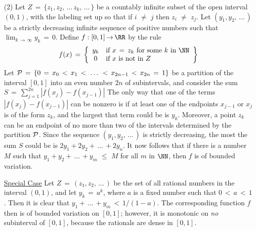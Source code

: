 \V
\V

        (2) Let $Z \,=\, \{z_{1},z_{2},\,{\ldots}\,z_{k},\,{\ldots}\,\}$ be a countably infinite subset of the open interval $(0,1)$,
    with the labeling set up so that if $i \,\,{\neq}\,\, j$ then $z_{i} \,\,{\neq}\,\, z_{j}$.
    Let $(y_{1},y_{2},\,{\ldots}\,)$ be a strictly decreasing infinite sequence of positive numbers such that $\lim_{k \,{\rightarrow}\, {\infty}} y_{k} \,=\, 0$.
    Define $f:[0,1] \,{\rightarrow}\, {\RR}$ by the rule
        \begin{displaymath}
        f(x) \,=\, \left\{
        \begin{array}{cl}
        y_{k} & \mbox{if $x \,=\, z_{k}$ for some $k$ in ${\NN}$} \\
          0   & \mbox{if $x$ is not in $Z$}
        \end{array}
                            \right\}
        \end{displaymath}
    Let ${\cal P} \,=\, \{0 \,=\, x_{0}\,<\,x_{1}\,<\,\,{\ldots}\,\,<\,x_{2n-1}\,<\,x_{2n} \,=\, 1\}$ be a partition of the interval $[0,1]$ into an even number $2n$ of subintervals,
    and consider the sum
        $S \,=\, \sum_{j=1}^{2n} |f(x_{j}) - f(x_{j-1})|$
    The only way that one of the terms $|f(x_{j}) - f(x_{j-1})|$ can be nonzero is if at least one of the endpoints $x_{j-1}$ or $x_{j}$ is of the form $z_{k}$, and the largest that term could be is $y_{k}$.
    Moreover, a point $z_{k}$ can be an endpoint of no more than two of the intervals determined by the partition ${\cal P}$.
    Since the sequence $(y_{1},y_{2},\,{\ldots}\,)$ is strictly decreasing, the most the sum $S$ could be is $2y_{1} + 2y_{2} + \,{\ldots}\,+ 2y_{n}$.
    It now follows that if there is a number $M$ such that $y_{1} + y_{2} + \,{\ldots}\,+y_{m}\,\,{\leq}\,\,M$ for all $m$ in ${\NN}$,
    then $f$ is of bounded variation.

        \underline{Special Case} Let $Z \,=\, (z_{1},z_{2},\,{\ldots}\,)$ be the set of all rational numbers in the interval $(0,1)$,
    and let $y_{k} \,=\, a^{k}$, where $a$ is a fixed number such that $0\,<\,a\,<\,1$.
    Then it is clear that $y_{1} + \,{\ldots}\,+ y_{m}\,<\,1/(1-a)$.
    The corresponding function $f$ then is of bounded variation on $[0,1]$; however, it is monotonic on {\em no} subinterval of $[0,1]$, because the rationals are dense in $[0,1]$.

\newpage

